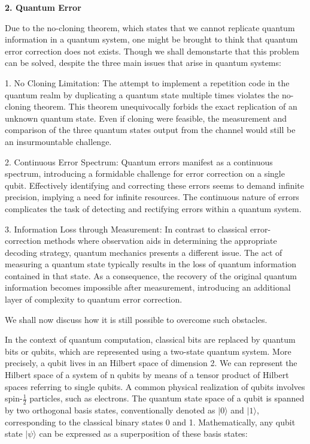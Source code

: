 \documentclass[12pt]{report}
\begin{document}
 
	\begin{minipage}{1 \textwidth}
		
		\textbf{2. Quantum Error}\newline
		
		Due to the no-cloning theorem, which states that we cannot replicate quantum information in a quantum system, one might be brought to think that quantum error correction does not exists. Though we shall demonstarte that this problem can be solved, despite the three main issues that arise in quantum systems: \newline
		
		1. No Cloning Limitation: The attempt to implement a repetition code in the quantum realm by duplicating a quantum state multiple times violates the no-cloning theorem. This theorem unequivocally forbids the exact replication of an unknown quantum state. Even if cloning were feasible, the measurement and comparison of the three quantum states output from the channel would still be an insurmountable challenge.\newline
		
		2. Continuous Error Spectrum: Quantum errors manifest as a continuous spectrum, introducing a formidable challenge for error correction on a single qubit. Effectively identifying and correcting these errors seems to demand infinite precision, implying a need for infinite resources. The continuous nature of errors complicates the task of detecting and rectifying errors within a quantum system.\newline
		
		3. Information Loss through Measurement: In contrast to classical error-correction methods where observation aids in determining the appropriate decoding strategy, quantum mechanics presents a different issue. The act of measuring a quantum state typically results in the loss of quantum information contained in that state. As a consequence, the recovery of the original quantum information becomes impossible after measurement, introducing an additional layer of complexity to quantum error correction. \newline
		
		
		We shall now discuss how it is still possible to overcome such obstacles.\newline
		
		
		In the context of quantum computation, classical bits are replaced by quantum bits or qubits, which are represented using a two-state quantum system. More precisely, a qubit lives in an Hilbert space of dimension 2. We can represent the Hilbert space of a system of n qubits by means of a tensor product of Hilbert spaces referring to single qubits. A common physical realization of qubits involves spin-$\frac{1}{2}$ particles, such as electrons. The quantum state space of a qubit is spanned by two orthogonal basis states, conventionally denoted as $ |0 \rangle$ and $ |1 \rangle$, corresponding to the classical binary states 0 and 1. Mathematically, any qubit state 
		$ |\psi \rangle$ can be expressed as a superposition of these basis states:
		

\end{minipage}
\end{document}
